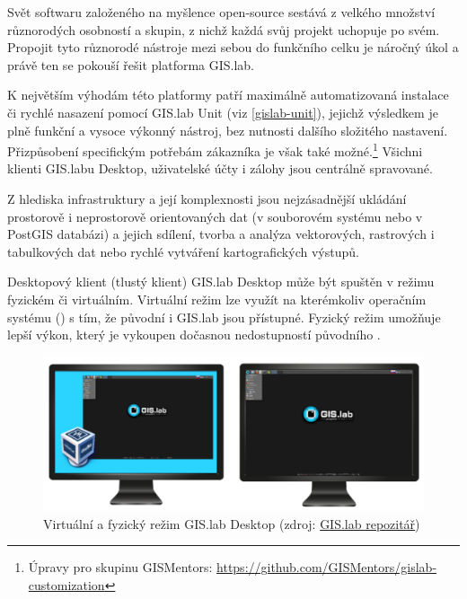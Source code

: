 Svět softwaru založeného na myšlence open-source sestává z velkého množství různorodých osobností a skupin, z nichž každá svůj projekt uchopuje po svém. Propojit tyto různorodé nástroje mezi sebou do funkčního celku je náročný úkol a právě ten se pokouší řešit platforma GIS.lab. 

K největším výhodám této platformy patří maximálně automatizovaná
instalace či rychlé nasazení pomocí GIS.lab Unit (viz
\ref{gislab-unit}), jejichž výsledkem je plně funkční a vysoce výkonný
nástroj, bez nutnosti dalšího složitého nastavení. Přizpůsobení
specifickým potřebám zákazníka je však také možné.\footnote{Úpravy pro skupinu GISMentors: \href{https://github.com/GISMentors/gislab-customization}{https://github.com/GISMentors/gislab-customization}} Všichni klienti GIS.labu Desktop, uživatelské účty i zálohy jsou centrálně spravované.

Z hlediska  infrastruktury a její komplexnosti jsou nejzásadnější ukládání prostorově i
neprostorově orientovaných dat (v souborovém systému nebo v PostGIS databázi) a jejich sdílení, tvorba a analýza
vektorových, rastrových i tabulkových dat nebo rychlé vytváření
kartografických výstupů. 

Desktopový klient (tlustý klient) GIS.lab Desktop může být spuštěn v
režimu fyzickém či virtuálním. Virtuální režim lze využít na
kterémkoliv operačním systému () s tím, že původní  i
GIS.lab jsou přístupné. Fyzický režim umožňuje lepší výkon, který je
vykoupen dočasnou nedostupností původního .

\begin{figure}[H] \centering
    \includegraphics[width=450pt]{./pictures/physical-or-virtual-mode.png}
    \caption[Virtuální a fyzický režim GIS.lab Desktop]{Virtuální a fyzický režim GIS.lab Desktop (zdroj:
	\href{https://github.com/gislab-npo/gislab-doc/blob/master/img/installation/physical-or-virtual-mode.png}{GIS.lab repozitář})}
	\label{fig:gislab-rezim}
\end{figure}

